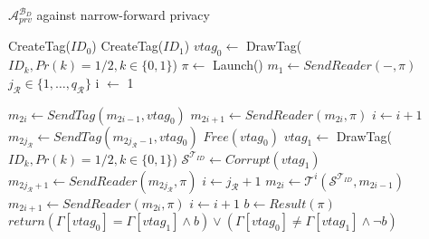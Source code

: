     \begin{algorithm}[H]
        \centering
        \caption{$\mathcal{A}_{prv}^{\mathcal{B}_D}$ against narrow-forward privacy}
        \begin{algorithmic}[1] %
            \State CreateTag($ID_0$)  
            \State CreateTag($ID_1$)  
            \State $vtag_{0} \leftarrow$ DrawTag($ID_k, Pr(k)= 1/2, k \in \{0,1\}$)  
            \State $\pi \leftarrow$ Launch()  
            \State $m_1 \leftarrow SendReader(-,\pi)$  
            \State $j_{\mathcal{R}} \in \{1, \dots, q_\mathcal{R}\}$
            \State i $\leftarrow$ 1

                \State $m_{2i} \gets SendTag(m_{2i-1}, vtag_{0})$  
                \State $m_{2i+1} \gets SendReader(m_{2i}, \pi)$  
                \State $i \gets i+1$
            \EndWhile
            \State $m_{2j_{\mathcal{R}}} \gets SendTag(m_{2j_{\mathcal{R}}-1}, vtag_{0})$ 
            \State $Free(vtag_{0})$
            \State $vtag_{1} \leftarrow$ DrawTag($ID_k, Pr(k)= 1/2, k \in \{0,1\}$)
            \State $\mathcal{S}^{\mathcal{T}_{ID}} \gets Corrupt(vtag_{1})$  
            \State $m_{2j_{\mathcal{R}}+1} \gets SendReader(m_{2j_{\mathcal{R}}}, \pi)$  
            \State $i \gets j_{\mathcal{R}}+1$
                \State $m_{2i} \gets \mathcal{T}^{i}(\mathcal{S}^{\mathcal{T}_{ID}}, m_{2i-1})$  
                \State $m_{2i+1} \gets SendReader(m_{2i}, \pi)$  
                \State $i \gets i+1$
            \EndWhile 
            \State $b \gets Result(\pi)$  
            \State $return (\Gamma[vtag_{0}] = \Gamma[vtag_{1}] \land b) \lor (\Gamma[vtag_{0}] \neq \Gamma[vtag_{1}] \land \lnot b)$
        \end{algorithmic}
    \end{algorithm}

